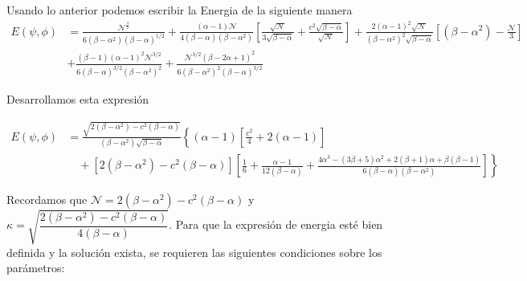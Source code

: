 \documentclass[letterpaper,11pt]{exam}
\theoremstyle{plain}
\begin{document}
Usando lo anterior podemos escribir la Energia de la siguiente manera
\begin{align*}
   E(\psi,\phi)&= \frac{\mathcal{N}^\frac{3}{2}}{6(\beta-\alpha^2)(\beta-\alpha)^{1/2}}+\frac{(\alpha-1)\mathcal{N}}{4(\beta-\alpha)(\beta-\alpha^2)}\left[\frac{\sqrt{\mathcal{N}}}{3\sqrt{\beta-\alpha}}+\frac{c^2\sqrt{\beta-\alpha}}{\sqrt{\mathcal{N}}}\right]+\frac{2(\alpha-1)^2\sqrt{\mathcal{N}}}{(\beta-\alpha^2)^2\sqrt{\beta-\alpha}}\left[(\beta-\alpha^2)-\frac{\mathcal{N}}{3}\right]\\[8pt]
   &+\frac{(\beta-1)(\alpha-1)^2\mathcal{N}^{3/2}}{6(\beta-\alpha)^{3/2}(\beta-\alpha^2)^2}+\frac{\mathcal{N}^{3/2}(\beta-2\alpha+1)^2}{6(\beta-\alpha^2)^2(\beta-\alpha)^{3/2}}
\end{align*}

Desarrollamos esta expresión 

\begin{align*}
E(\psi,\phi) &= \frac{\sqrt{2(\beta-\alpha^2)-c^2(\beta-\alpha)}}{(\beta-\alpha^2)\sqrt{\beta-\alpha}}\left\{(\alpha-1)\left[\frac{c^2}{4}+2(\alpha-1)\right]\right.\\[8pt]
&\quad+\left.[2(\beta-\alpha^2)-c^2(\beta-\alpha)]\left[\frac{1}{6}+\frac{\alpha-1}{12(\beta-\alpha)}+\frac{4\alpha^3-(3\beta+5)\alpha^2+2(\beta+1)\alpha+\beta(\beta-1)}{6(\beta-\alpha)(\beta-\alpha^2)}\right]\right\}
\end{align*}

Recordamos que $\mathcal{N} = 2(\beta-\alpha^2)-c^2(\beta-\alpha)$ y $\kappa = \sqrt{\dfrac{2(\beta-\alpha^2)-c^2(\beta-\alpha)}{4(\beta-\alpha)}}$. Para que la expresión de energia esté bien definida y la solución exista, se requieren las siguientes condiciones sobre los parámetros:
\end{document}
